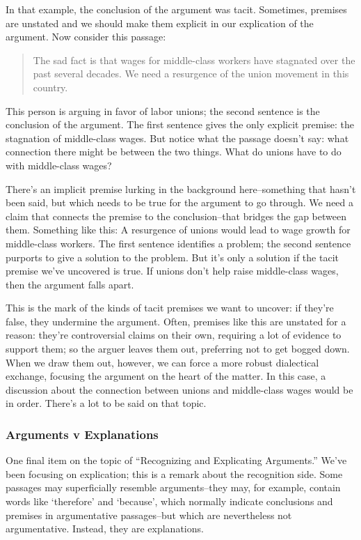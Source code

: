 In that example, the conclusion of the argument was tacit. Sometimes, premises are unstated and
we should make them explicit in our explication of the argument. Now consider this passage:

\begin{quote}
The sad fact is that wages for middle-class workers have stagnated over the past several
decades. We need a resurgence of the union movement in this country.
\end{quote}

This person is arguing in favor of labor unions; the second sentence is the conclusion of the
argument. The first sentence gives the only explicit premise: the stagnation of middle-class wages.
But notice what the passage doesn't say: what connection there might be between the two things.
What do unions have to do with middle-class wages?

There's an implicit premise lurking in the background here--something that hasn't been said, but
which needs to be true for the argument to go through. We need a claim that connects the premise
to the conclusion--that bridges the gap between them. Something like this: A resurgence of unions
would lead to wage growth for middle-class workers. The first sentence identifies a problem; the
second sentence purports to give a solution to the problem. But it's only a solution if the tacit
premise we've uncovered is true. If unions don't help raise middle-class wages, then the argument
falls apart.

This is the mark of the kinds of tacit premises we want to uncover: if they're false, they undermine
the argument. Often, premises like this are unstated for a reason: they're controversial claims on
their own, requiring a lot of evidence to support them; so the arguer leaves them out, preferring
not to get bogged down. When we draw them out, however, we can force a more robust dialectical
exchange, focusing the argument on the heart of the matter. In this case, a discussion about the
connection between unions and middle-class wages would be in order. There's a lot to be said on
that topic.

\subsubsection{Arguments v Explanations}
One final item on the topic of ``Recognizing and Explicating Arguments.'' We've been focusing
on explication; this is a remark about the recognition side. Some passages may superficially
resemble arguments--they may, for example, contain words like `therefore' and `because', which
normally indicate conclusions and premises in argumentative passages--but which are
nevertheless not argumentative. Instead, they are explanations.

